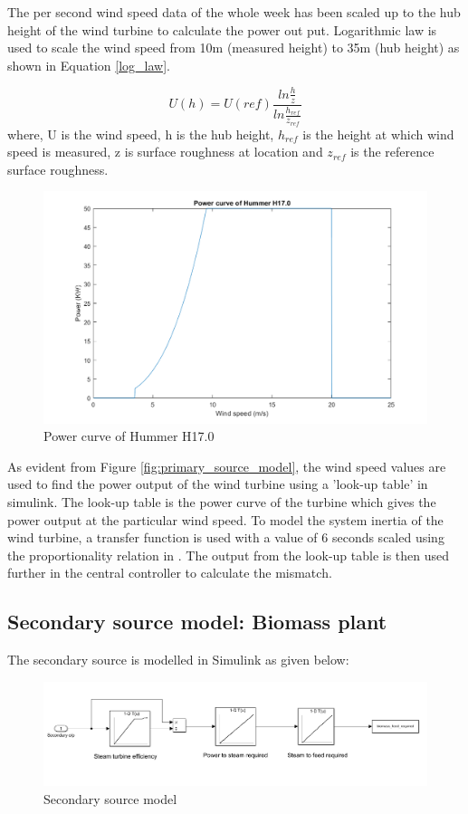 \noindent The per second wind speed data of the whole week has been scaled up to the hub height of the wind turbine to calculate the power out put. Logarithmic law is used to scale the wind speed from 10m (measured height) to 35m (hub height) as shown in Equation \ref{log_law}. 

\begin{equation}\label{log_law}
    U(h)=U(ref)\frac{ln\frac{h}{z}}{ln\frac{h_{ref}}{z_{ref}}}
\end{equation}
\noindent where, U is the wind speed, h is the hub height, $h_{ref}$ is the height at which wind speed is measured, z is surface roughness at location and $z_{ref}$ is the reference surface roughness.

\begin{figure}[H]
    \centering
    \includegraphics[width = 0.6 \linewidth]{Final_report/Images/power_curve_hummer.png}
    \caption{Power curve of Hummer H17.0}
    \label{fig:power_curve}
\end{figure}

\noindent As evident from Figure \ref{fig:primary_source_model}, the wind speed values are used to find the power output of the wind turbine using a 'look-up table' in simulink. The look-up table is the power curve of the turbine which gives the power output at the particular wind speed. To model the system inertia of the wind turbine, a transfer function is used with a value of 6 seconds scaled using the proportionality relation in \citep{Tang2008}. The output from the look-up table is then used further in the central controller to calculate the mismatch.



\subsection{Secondary source model: Biomass plant}
The secondary source is modelled in Simulink as given below:
\begin{figure}[H]
    \centering
    \includegraphics[width = 0.9 \linewidth]{Final_report/Images/feed_calculations.PNG}
    \caption{Secondary source model}
    \label{fig:secondary model}
\end{figure}

